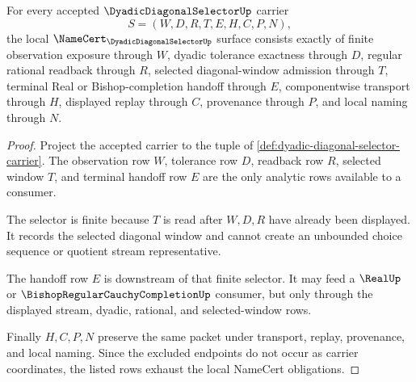 \begin{theorem}
\label{thm:dyadic-diagonal-selector-namecert-obligations}
For every accepted $\DyadicDiagonalSelectorUp$ carrier
$$
S=(W,D,R,T,E,H,C,P,N),
$$
the local $\NameCert_{\DyadicDiagonalSelectorUp}$ surface consists exactly of finite observation exposure through $W$, dyadic tolerance exactness through $D$, regular rational readback through $R$, selected diagonal-window admission through $T$, terminal Real or Bishop-completion handoff through $E$, componentwise transport through $H$, displayed replay through $C$, provenance through $P$, and local naming through $N$.
\end{theorem}
\begin{proof}
Project the accepted carrier to the tuple of \autoref{def:dyadic-diagonal-selector-carrier}. The observation row $W$, tolerance row $D$, readback row $R$, selected window $T$, and terminal handoff row $E$ are the only analytic rows available to a consumer.

The selector is finite because $T$ is read after $W,D,R$ have already been displayed. It records the selected diagonal window and cannot create an unbounded choice sequence or quotient stream representative.

The handoff row $E$ is downstream of that finite selector. It may feed a $\RealUp$ or $\BishopRegularCauchyCompletionUp$ consumer, but only through the displayed stream, dyadic, rational, and selected-window rows.

Finally $H,C,P,N$ preserve the same packet under transport, replay, provenance, and local naming. Since the excluded endpoints do not occur as carrier coordinates, the listed rows exhaust the local NameCert obligations.
\end{proof}

